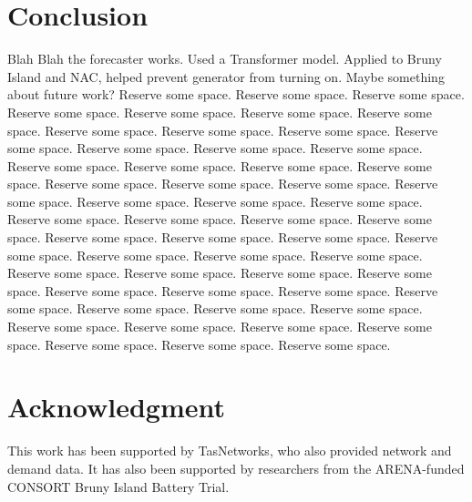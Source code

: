 \documentclass[conference]{IEEEtran}
\begin{document}
\section{Conclusion}
Blah Blah the forecaster works.
Used a Transformer model.
Applied to Bruny Island and NAC, helped prevent generator from turning on.
Maybe something about future work?
Reserve some space. Reserve some space. Reserve some space.
Reserve some space. Reserve some space. Reserve some space.
Reserve some space. Reserve some space. Reserve some space.
Reserve some space. Reserve some space. Reserve some space.
Reserve some space. Reserve some space. Reserve some space.
Reserve some space. Reserve some space. Reserve some space.
Reserve some space. Reserve some space. Reserve some space.
Reserve some space. Reserve some space. Reserve some space.
Reserve some space. Reserve some space. Reserve some space.
Reserve some space. Reserve some space. Reserve some space.
Reserve some space. Reserve some space. Reserve some space.
Reserve some space. Reserve some space. Reserve some space.
Reserve some space. Reserve some space. Reserve some space.
Reserve some space. Reserve some space. Reserve some space.
Reserve some space. Reserve some space. Reserve some space.
Reserve some space. Reserve some space. Reserve some space.
Reserve some space. Reserve some space. Reserve some space.
Reserve some space. Reserve some space. Reserve some space.



\section*{Acknowledgment}
This work has been supported by TasNetworks, who also provided network and demand data. It has also been supported by researchers from the ARENA-funded CONSORT Bruny Island Battery Trial.




\end{document}
